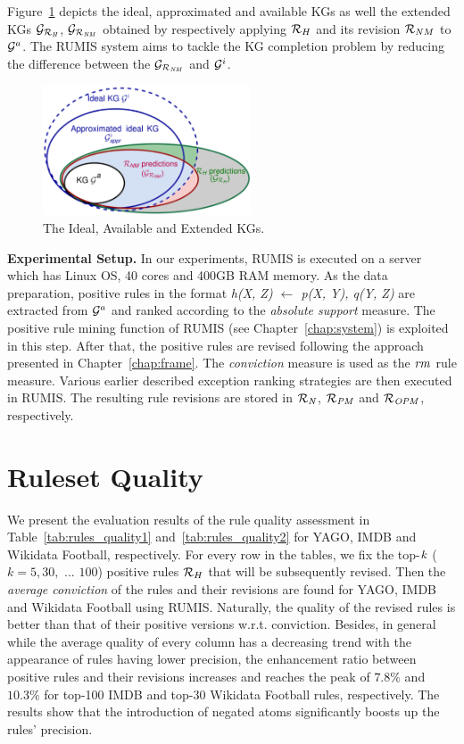 Figure~\ref{fig:venn} depicts the ideal, approximated and available KGs as well the extended KGs $\mathcal{G}_{\mathcal{R}_{\mathit{H}}}$, $\mathcal{G}_{\mathcal{R}_{\mathit{NM}}}$ obtained by respectively applying $\mathcal{R}_H$ and its revision $\mathcal{R}_{NM}$ to $\mathcal{G}^a$. The RUMIS system aims to tackle the KG completion problem by reducing the difference between the $\mathcal{G}_{\mathcal{R}_{\mathit{NM}}}$ and $ \mathcal{G}^i$.

\begin{figure}[ht]
\centering
\includegraphics[width=0.55\textwidth]{figures/big_pic_exp}
\caption{The Ideal, Available and Extended KGs.}
\label{fig:venn}
\end{figure}

\textbf{Experimental Setup.} In our experiments, RUMIS is executed on a server which has Linux OS, 40 cores and 400GB RAM memory. As the data preparation, positive rules in the format \textit{h(X, Z) $\leftarrow$ p(X, Y), q(Y, Z)} are extracted from $\mathcal{G}^a$ and ranked according to the \textit{absolute support} measure. The positive rule mining function of RUMIS (see Chapter~\ref{chap:system}) is exploited in this step. After that, the positive rules are revised following the approach presented in Chapter~\ref{chap:frame}. The \textit{conviction} measure is used as the $\mathit{rm}$ rule measure. Various earlier described exception ranking strategies are then executed in RUMIS. The resulting rule revisions are stored in $\mathit{\mathcal{R}_{N}}$, $\mathit{\mathcal{R}_{PM}}$ and $\mathit{\mathcal{R}_{OPM}}$, respectively.

\section{Ruleset Quality}

We present the evaluation results of the rule quality assessment in Table~\ref{tab:rules_quality1} and~\ref{tab:rules_quality2} for YAGO, IMDB and Wikidata Football, respectively. For every row in the tables, we fix the top-$\mathit{k}$ ($k=5,30,$ ... $100$) positive rules $\mathcal{R}_{H}$ that will be subsequently revised. Then the \textit{average conviction} of the rules and their revisions are found for YAGO, IMDB and Wikidata Football using RUMIS. Naturally, the quality of the revised rules is better than that of their positive versions w.r.t. conviction. Besides, in general while the average quality of every column has a decreasing trend with the appearance of rules having lower precision, the enhancement ratio between positive rules and their revisions increases and reaches the peak of $7.8\%$ and $10.3\%$ for top-100 IMDB and top-30 Wikidata Football rules, respectively. The results show that the introduction of negated atoms significantly boosts up the rules' precision.

